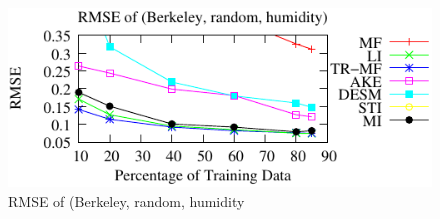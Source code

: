 \begin{figure}[H]
\centering
\includegraphics[scale=1]{table2_BRH}
\caption{RMSE of (Berkeley, random, humidity}
\end{figure}